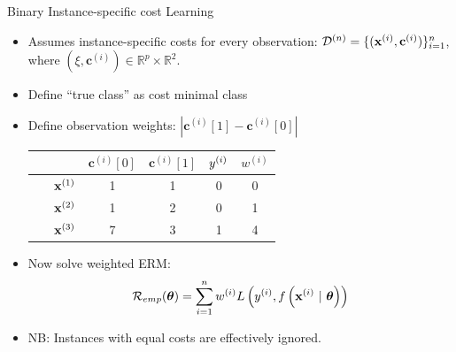 \documentclass[11pt,compress,t,notes=noshow, xcolor=table]{beamer}
\newcommand{\cv}{\mathbf{c}}
\begin{document}
\begin{frame}{Binary Instance-specific cost Learning}
    \begin{itemize}
        \item Assumes instance-specific costs for every observation:  $\D^{(n)} = \{(\xi, \cv^{(i)})\}_{i=1}^n$, where $(\xi, \cv^{(i)}) \in \mathbb{R}^p \times \mathbb{R}^2$.

        \item Define ``true class'' as cost minimal class
        
        \item Define observation weights: $|\cv^{(i)}[1] - \cv^{(i)}[0]|$

        \begin{center}
            \begin{tabular}{cc|cccc}\
        			& & $\cv^{(i)}[0]$ & $\cv^{(i)}[1]$ & $y^{(i)}$ & $w^{(i)}$ \\
        			\hline & $\mathbf{x}^{(1)}$ & 1 & 1 & 0 & 0\\
        			& $\mathbf{x}^{(2)}$ & 1 & 2 & 0 & 1\\
        			& $\mathbf{x}^{(3)}$ & 7 & 3 & 1 & 4\\
            \end{tabular}
        \end{center}

        \item Now solve weighted ERM:
        \begin{equation*}
            \mathcal{R}_{emp}(\boldsymbol{\theta}) = \sum_{i=1}^{n}w^{(i)} L\left(y^{(i)}, f\left(\mathbf{x}^{(i)} ~|~ \bm{\theta}\right)\right)
        \end{equation*}
        
        \item NB: Instances with equal costs are effectively ignored.
        \end{itemize}
            
\end{frame}
\end{document}
